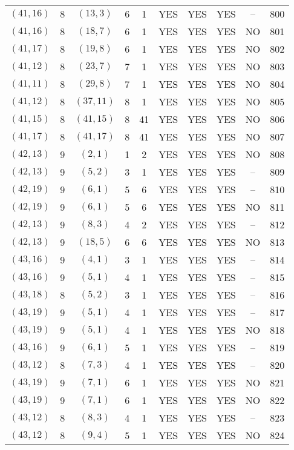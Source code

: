 \begin{longtable}{|c|c|c|c|c|c|c|c|c|c|}
$(41, 16)$ & 8 & $(13, 3)$ & 6 & 1 & YES & YES & YES & -- & 800\\
$(41, 16)$ & 8 & $(18, 7)$ & 6 & 1 & YES & YES & YES & NO & 801\\
$(41, 17)$ & 8 & $(19, 8)$ & 6 & 1 & YES & YES & YES & NO & 802\\
$(41, 12)$ & 8 & $(23, 7)$ & 7 & 1 & YES & YES & YES & NO & 803\\
$(41, 11)$ & 8 & $(29, 8)$ & 7 & 1 & YES & YES & YES & NO & 804\\
$(41, 12)$ & 8 & $(37, 11)$ & 8 & 1 & YES & YES & YES & NO & 805\\
$(41, 15)$ & 8 & $(41, 15)$ & 8 & 41 & YES & YES & YES & NO & 806\\
$(41, 17)$ & 8 & $(41, 17)$ & 8 & 41 & YES & YES & YES & NO & 807\\
$(42, 13)$ & 9 & $(2, 1)$ & 1 & 2 & YES & YES & YES & NO & 808\\
$(42, 13)$ & 9 & $(5, 2)$ & 3 & 1 & YES & YES & YES & -- & 809\\
$(42, 19)$ & 9 & $(6, 1)$ & 5 & 6 & YES & YES & YES & -- & 810\\
$(42, 19)$ & 9 & $(6, 1)$ & 5 & 6 & YES & YES & YES & NO & 811\\
$(42, 13)$ & 9 & $(8, 3)$ & 4 & 2 & YES & YES & YES & -- & 812\\
$(42, 13)$ & 9 & $(18, 5)$ & 6 & 6 & YES & YES & YES & NO & 813\\
$(43, 16)$ & 9 & $(4, 1)$ & 3 & 1 & YES & YES & YES & -- & 814\\
$(43, 16)$ & 9 & $(5, 1)$ & 4 & 1 & YES & YES & YES & -- & 815\\
$(43, 18)$ & 8 & $(5, 2)$ & 3 & 1 & YES & YES & YES & -- & 816\\
$(43, 19)$ & 9 & $(5, 1)$ & 4 & 1 & YES & YES & YES & -- & 817\\
$(43, 19)$ & 9 & $(5, 1)$ & 4 & 1 & YES & YES & YES & NO & 818\\
$(43, 16)$ & 9 & $(6, 1)$ & 5 & 1 & YES & YES & YES & -- & 819\\
$(43, 12)$ & 8 & $(7, 3)$ & 4 & 1 & YES & YES & YES & -- & 820\\
$(43, 19)$ & 9 & $(7, 1)$ & 6 & 1 & YES & YES & YES & NO & 821\\
$(43, 19)$ & 9 & $(7, 1)$ & 6 & 1 & YES & YES & YES & NO & 822\\
$(43, 12)$ & 8 & $(8, 3)$ & 4 & 1 & YES & YES & YES & -- & 823\\
$(43, 12)$ & 8 & $(9, 4)$ & 5 & 1 & YES & YES & YES & NO & 824\\

\end{longtable}
